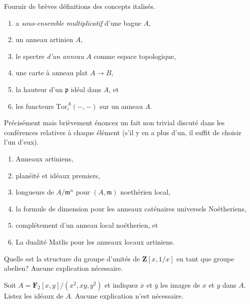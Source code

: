 \begin{exercise}[Definitions]
\label{exercise-definitions-fall-2021}
Fournir de brèves définitions des concepts italisés.
\begin{enumerate}
\item a {\it sous-ensemble multiplicatif} d'une bague $A$,
\item un anneau artinien {\it } $A$,
\item le spectre {\it d'un anneau} $A$ comme espace topologique,
\item une carte à anneau plat {\it } $A \to B$,
\item la hauteur {\it} d'un $\mathfrak p$ idéal dans $A$, et
\item les functeurs {\it $\text{Tor}^A_i(-, -)$} sur un anneau $A$.
\end{enumerate}
\end{exercise}

\begin{exercise}[Theorems]
\label{exercise-results-fall-2021}
Précisément mais brièvement énoncez un fait non trivial discuté dans les conférences relatives à
chaque élément (s'il y en a plus d'un, il suffit de choisir
l'un d'eux).
\begin{enumerate}
\item Anneaux artiniens,
\item planéité et idéaux premiers,
\item longueurs de $A/\mathfrak m^n$ pour $(A, \mathfrak m)$ noethérien local,
\item la formule de dimension pour les anneaux caténaires universels Noétheriens,
\item complétement d'un anneau local noétherien, et
\item La dualité Matlis pour les anneaux locaux artiniens.
\end{enumerate}
\end{exercise}

\begin{exercise}[Units]
\label{exercise-simple-units}
Quelle est la structure du groupe d'unités de $\mathbf{Z}[x, 1/x]$ en
tant que groupe abelien? Aucune explication nécessaire.
\end{exercise}

\begin{exercise}[Ideals]
\label{exercise-ideals}
Soit $A = \mathbf{F}_2[x, y]/(x^2, xy, y^2)$ et indiquez
$\overline{x}$ et $\overline{y}$ les images de $x$ et $y$ dans $A$. Listez
les idéaux de $A$. Aucune explication n'est nécessaire.
\end{exercise}

